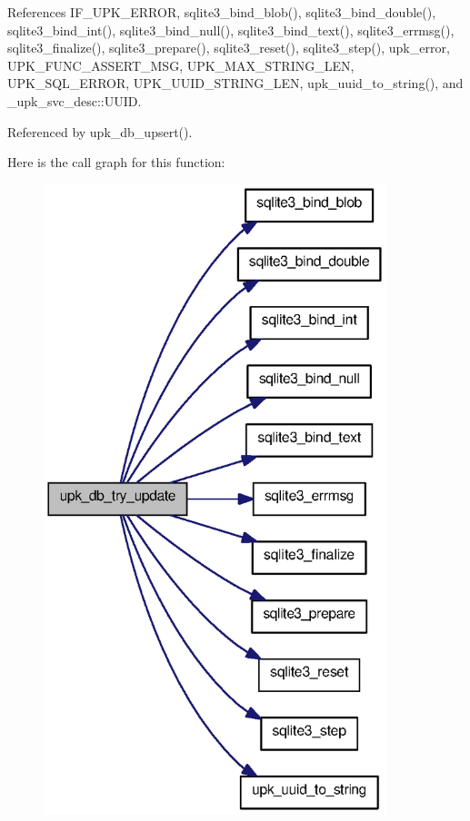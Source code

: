 References IF\_\-UPK\_\-ERROR, sqlite3\_\-bind\_\-blob(), sqlite3\_\-bind\_\-double(), sqlite3\_\-bind\_\-int(), sqlite3\_\-bind\_\-null(), sqlite3\_\-bind\_\-text(), sqlite3\_\-errmsg(), sqlite3\_\-finalize(), sqlite3\_\-prepare(), sqlite3\_\-reset(), sqlite3\_\-step(), upk\_\-error, UPK\_\-FUNC\_\-ASSERT\_\-MSG, UPK\_\-MAX\_\-STRING\_\-LEN, UPK\_\-SQL\_\-ERROR, UPK\_\-UUID\_\-STRING\_\-LEN, upk\_\-uuid\_\-to\_\-string(), and \_\-upk\_\-svc\_\-desc::UUID.



Referenced by upk\_\-db\_\-upsert().



Here is the call graph for this function:
\nopagebreak
\begin{figure}[H]
\begin{center}
\leavevmode
\includegraphics[width=282pt]{group__controller_ga53ec64d322d09e9d36a48d706db3b1c0_cgraph}
\end{center}
\end{figure}




